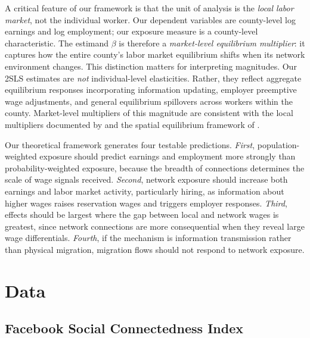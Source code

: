 \documentclass[12pt]{article}
\begin{document}
A critical feature of our framework is that the unit of analysis is the \textit{local labor market}, not the individual worker. Our dependent variables are county-level log earnings and log employment; our exposure measure is a county-level characteristic. The estimand $\beta$ is therefore a \textit{market-level equilibrium multiplier}: it captures how the entire county's labor market equilibrium shifts when its network environment changes. This distinction matters for interpreting magnitudes. Our 2SLS estimates are \textit{not} individual-level elasticities. Rather, they reflect aggregate equilibrium responses incorporating information updating, employer preemptive wage adjustments, and general equilibrium spillovers across workers within the county. Market-level multipliers of this magnitude are consistent with the local multipliers documented by \citet{moretti2011local} and the spatial equilibrium framework of \citet{roback1982wages}.

Our theoretical framework generates four testable predictions. \textit{First}, population-weighted exposure should predict earnings and employment more strongly than probability-weighted exposure, because the breadth of connections determines the scale of wage signals received. \textit{Second}, network exposure should increase both earnings and labor market activity, particularly hiring, as information about higher wages raises reservation wages and triggers employer responses. \textit{Third}, effects should be largest where the gap between local and network wages is greatest, since network connections are more consequential when they reveal large wage differentials. \textit{Fourth}, if the mechanism is information transmission rather than physical migration, migration flows should not respond to network exposure.


\section{Data}
\label{sec:data}

\subsection{Facebook Social Connectedness Index}
\end{document}
